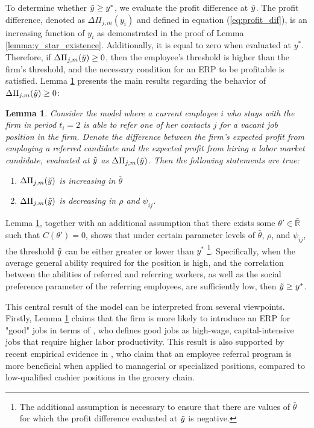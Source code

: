 \documentclass[12pt]{article}
\newtheorem{lemma}{Lemma}
\begin{document}
To determine whether $\Tilde{y} \geq y^*$, we evaluate the profit difference at $\Tilde{y}$. The profit difference, denoted as $\Delta \Pi_{j,m}(y_i)$ and defined in equation (\ref{eq:profit_dif}), is an increasing function of $y_i$ as demonstrated in the proof of Lemma \ref{lemma:y_star_existence}. Additionally, it is equal to zero when evaluated at $y^*$. Therefore, if $\Delta \Pi_{j,m}(\Tilde{y}) \geq 0$, then the employee's threshold is higher than the firm's threshold, and the necessary condition for an ERP to be profitable is satisfied. Lemma \ref{lemma:erp_existence} presents the main results regarding the behavior of $\Delta \Pi_{j,m}(\Tilde{y}) \geq 0$:
\begin{lemma}\label{lemma:erp_existence}
    Consider the model where a current employee $i$ who stays with the firm in period $t_i = 2$ is able to refer one of her contacts $j$ for a vacant job position in the firm. Denote the difference between the firm’s expected profit from employing a referred candidate and the expected profit from hiring a labor market candidate, evaluated at $\Tilde{y}$ as $\Delta\Pi_{j,m}(\Tilde{y})$. Then the following statements are true:
    \begin{enumerate}[label={\roman*})]
        \item $\Delta\Pi_{j,m}(\Tilde{y})$ is increasing in $\bar{\theta}$
        \item $\Delta\Pi_{j,m}(\Tilde{y})$ is decreasing in $\rho$ and $\psi_{ij}$.
    \end{enumerate}
\end{lemma}

Lemma \ref{lemma:erp_existence}, together with an additional assumption that there exists some $\theta' \in \bar{\mathbb{R}}$ such that $C(\theta') = 0$, shows that under certain parameter levels of $\bar{\theta}$, $\rho$, and $\psi_{ij}$, the threshold $\Tilde{y}$ can be either greater or lower than $y^*$ \footnote{The additional assumption is necessary to ensure that there are values of $\bar{\theta}$ for which the profit difference evaluated at $\Tilde{y}$ is negative.}. Specifically, when the average general ability required for the position is high, and the correlation between the abilities of referred and referring workers, as well as the social preference parameter of the referring employees, are sufficiently low, then $\Tilde{y} \geq y^*$.

This central result of the model can be interpreted from several viewpoints. Firstly, Lemma \ref{lemma:erp_existence} claims that the firm is more likely to introduce an ERP for "good" jobs in terms of \cite{acemoglu2001good}, who defines good jobs as high-wage, capital-intensive jobs that require higher labor productivity. This result is also supported by recent empirical evidence in \cite{friebel2023employee}, who claim that an employee referral program is more beneficial when applied to managerial or specialized positions, compared to low-qualified cashier positions in the grocery chain.
\end{document}
